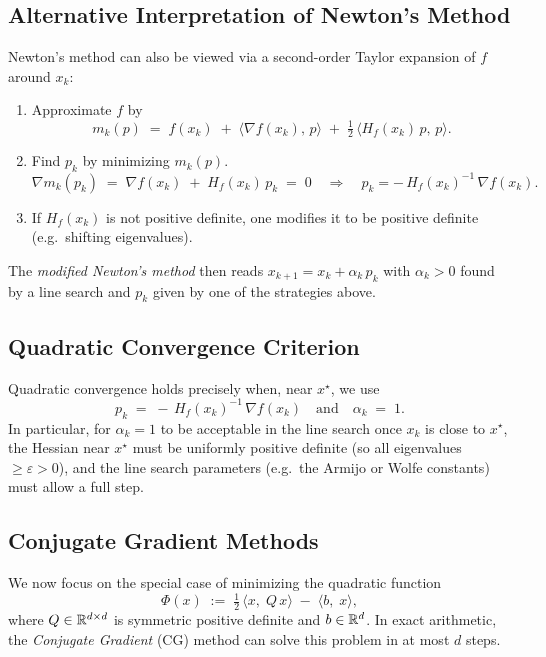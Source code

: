 \subsection*{Alternative Interpretation of Newton's Method}
Newton's method can also be viewed via a second-order Taylor expansion of \(f\) around \(x_k\):

\begin{enumerate}
  \item Approximate \(f\) by
        \[
          m_k(p) \;=\; f(x_k) \;+\; \langle \nabla f(x_k),\, p\rangle \;+\; \tfrac12\,\langle H_f(x_k)\,p,\,p\rangle.
        \]
  \item Find \(p_k\) by minimizing \(m_k(p)\).
        \[
          \nabla m_k(p_k) \;=\; \nabla f(x_k) \;+\; H_f(x_k)\,p_k \;=\; 0
          \quad\Longrightarrow\quad
          p_k = -\,H_f(x_k)^{-1}\,\nabla f(x_k).
        \]
  \item If \(H_f(x_k)\) is not positive definite, one modifies it to be positive definite (e.g.\ shifting eigenvalues).
\end{enumerate}

The \emph{modified Newton's method} then reads \(x_{k+1} = x_k + \alpha_k\,p_k\) with \(\alpha_k>0\) found by a line search and \(p_k\) given by one of the strategies above.

\subsection*{Quadratic Convergence Criterion}
Quadratic convergence holds precisely when, near \(x^\star\), we use
\[
  p_k \;=\; -\,H_f(x_k)^{-1}\,\nabla f(x_k)
  \quad\text{and}\quad
  \alpha_k \;=\; 1.
\]
In particular, for \(\alpha_k = 1\) to be acceptable in the line search once \(x_k\) is close to \(x^\star\), the Hessian near \(x^\star\) must be uniformly positive definite (so all eigenvalues \(\ge \varepsilon > 0\)), and the line search parameters (e.g.\ the Armijo or Wolfe constants) must allow a full step.

\subsection*{Conjugate Gradient Methods}

We now focus on the special case of minimizing the quadratic function
\[
  \Phi(x) \;:=\; \tfrac12\,\langle x,\;Q\,x\rangle \;-\; \langle b,\;x\rangle,
\]
where \(Q \in \mathbb{R}^{d\times d}\) is symmetric positive definite and \(b \in \mathbb{R}^d\). In exact arithmetic, the \emph{Conjugate Gradient} (CG) method can solve this problem in at most \(d\) steps.


